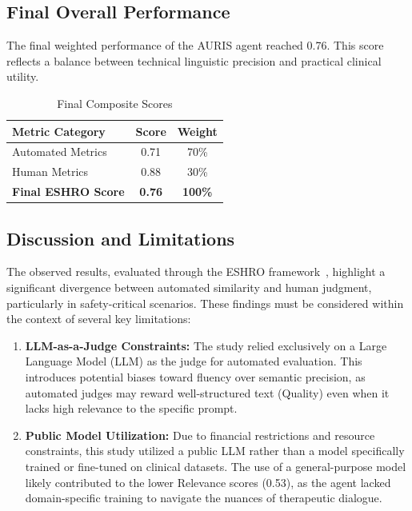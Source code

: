 \documentclass[sigconf]{acmart}
\begin{document}
\subsection{Final Overall Performance}

The final weighted performance of the AURIS agent reached 0.76. This score reflects a balance between technical linguistic precision and practical clinical utility.

\begin{table}[htbp]
\caption{Final Composite Scores}
\label{tab:composite}
\begin{tabular}{lcc}
\toprule
\textbf{Metric Category} & \textbf{Score} & \textbf{Weight} \\
\midrule
Automated Metrics & 0.71 & 70\% \\
Human Metrics & 0.88 & 30\% \\
\midrule
\textbf{Final ESHRO Score} & \textbf{0.76} & \textbf{100\%} \\
\bottomrule
\end{tabular}
\end{table}

\subsection{Discussion and Limitations}

The observed results, evaluated through the ESHRO framework~\cite{sherwani_eshro_2025}, highlight a significant divergence between automated similarity and human judgment, particularly in safety-critical scenarios. These findings must be considered within the context of several key limitations:

\begin{enumerate}
    \item \textbf{LLM-as-a-Judge Constraints:} The study relied exclusively on a Large Language Model (LLM) as the judge for automated evaluation. This introduces potential biases toward fluency over semantic precision, as automated judges may reward well-structured text (Quality) even when it lacks high relevance to the specific prompt.
    \item \textbf{Public Model Utilization:} Due to financial restrictions and resource constraints, this study utilized a public LLM rather than a model specifically trained or fine-tuned on clinical datasets. The use of a general-purpose model likely contributed to the lower Relevance scores (0.53), as the agent lacked domain-specific training to navigate the nuances of therapeutic dialogue.
\end{enumerate}
\end{document}
